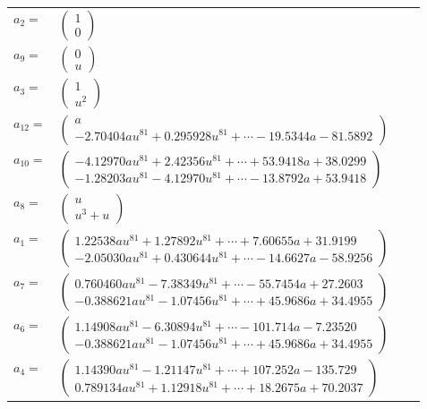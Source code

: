 \documentclass[1p]{elsarticle_modified}
\theoremstyle{definition}
\begin{document}
\begin{tabular}{m{7pt} m{180pt} m{7pt} m{180pt} }
\flushright $a_{2}=$&$\begin{pmatrix}1\\0\end{pmatrix}$ \\
\flushright $a_{9}=$&$\begin{pmatrix}0\\u\end{pmatrix}$ \\
\flushright $a_{3}=$&$\begin{pmatrix}1\\u^2\end{pmatrix}$ \\
\flushright $a_{12}=$&$\begin{pmatrix}a\\-2.70404 a u^{81}+0.295928 u^{81}+\cdots-19.5344 a-81.5892\end{pmatrix}$ \\
\flushright $a_{10}=$&$\begin{pmatrix}-4.12970 a u^{81}+2.42356 u^{81}+\cdots+53.9418 a+38.0299\\-1.28203 a u^{81}-4.12970 u^{81}+\cdots-13.8792 a+53.9418\end{pmatrix}$ \\
\flushright $a_{8}=$&$\begin{pmatrix}u\\u^3+u\end{pmatrix}$ \\
\flushright $a_{1}=$&$\begin{pmatrix}1.22538 a u^{81}+1.27892 u^{81}+\cdots+7.60655 a+31.9199\\-2.05030 a u^{81}+0.430644 u^{81}+\cdots-14.6627 a-58.9256\end{pmatrix}$ \\
\flushright $a_{7}=$&$\begin{pmatrix}0.760460 a u^{81}-7.38349 u^{81}+\cdots-55.7454 a+27.2603\\-0.388621 a u^{81}-1.07456 u^{81}+\cdots+45.9686 a+34.4955\end{pmatrix}$ \\
\flushright $a_{6}=$&$\begin{pmatrix}1.14908 a u^{81}-6.30894 u^{81}+\cdots-101.714 a-7.23520\\-0.388621 a u^{81}-1.07456 u^{81}+\cdots+45.9686 a+34.4955\end{pmatrix}$ \\
\flushright $a_{4}=$&$\begin{pmatrix}1.14390 a u^{81}-1.21147 u^{81}+\cdots+107.252 a-135.729\\0.789134 a u^{81}+1.12918 u^{81}+\cdots+18.2675 a+70.2037\end{pmatrix}$ \\

\end{tabular}
\end{document}
